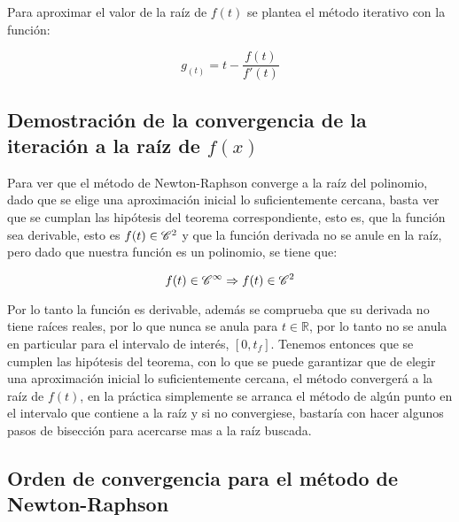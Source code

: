 
Para aproximar el valor de la raíz de $f(t)$ se plantea el método iterativo con la función:


\[g_{(t)} = t - \frac{{f(t)}}{{f'(t)}}\]

\subsection{ Demostración de la convergencia de la iteración a la raíz de $f(x)$}

Para ver que el método de Newton-Raphson converge a la raíz del polinomio, dado que se elige una aproximación inicial lo suficientemente cercana, basta ver que se cumplan las hipótesis del teorema correspondiente, esto es, que la función sea derivable, esto es $f(t) \in {\rm{ }}\mathscr{C}^{2}$ y que la función derivada no se anule en la raíz, pero dado que nuestra función es un polinomio, se tiene que:

\[
f(t) \in {\rm{ }}\mathscr{C}^{\infty} \Rightarrow f(t) \in {\rm{ }}\mathscr{C}^{2}
\]

Por lo tanto la función es derivable, además se comprueba que su derivada no tiene raíces reales, por lo que nunca se anula para $t \in \mathbb{R}$, por lo tanto no se anula en particular para el intervalo de interés, $[0, t_{f}]$. Tenemos entonces que se cumplen las hipótesis del teorema, con lo que se puede garantizar que de elegir una aproximación inicial lo suficientemente cercana, el método convergerá a la raíz de $f(t)$, en la práctica simplemente se arranca el método de algún punto en el intervalo que contiene a la raíz y si no convergiese, bastaría con hacer algunos pasos de bisección para acercarse mas a la raíz buscada.


\clearpage

\subsection{ Orden de convergencia para el método de Newton-Raphson }


\edef\iterationscount{\DTLrowcount{extraresultsnrdb}}

\edef\iterl{\iterationscount}
\edef\iterlp{\intcalcDec{\iterl}}
\edef\iterlpp{\intcalcDec{\iterlp}}
\edef\iterlppp{\intcalcDec{\iterlpp}}


